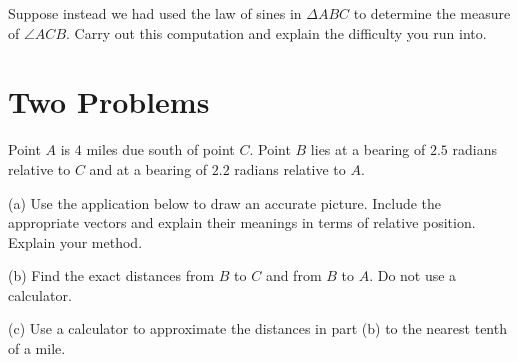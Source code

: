 \documentclass{ximera}
\begin{document}
\begin{example}
\begin{explanation}
\begin{question}  \label{Qertr452}
Suppose instead we had used the law of sines in $\Delta ABC$ to determine the measure of $\angle ACB$. Carry out this computation and explain the difficulty you run into.
\end{question}

\end{explanation}

\end{example}


\section{Two Problems}

\begin{question}  \label{Qwereduy764}
Point $A$ is $4$ miles due south of point $C$. Point $B$ lies at a bearing of $2.5$ radians relative to $C$ and at a bearing of $2.2$ radians relative to $A$.

(a) Use the application below to draw an accurate picture. Include the appropriate vectors and explain their meanings in terms of relative position. Explain your method.

(b) Find the exact distances from $B$ to $C$ and from $B$ to $A$. Do not use a calculator.

(c) Use a calculator to approximate the distances in part (b) to the nearest tenth of a mile.

 
\begin{onlineOnly}
    \begin{center}
\end{center}
\end{onlineOnly}
\end{question}
\end{document}
